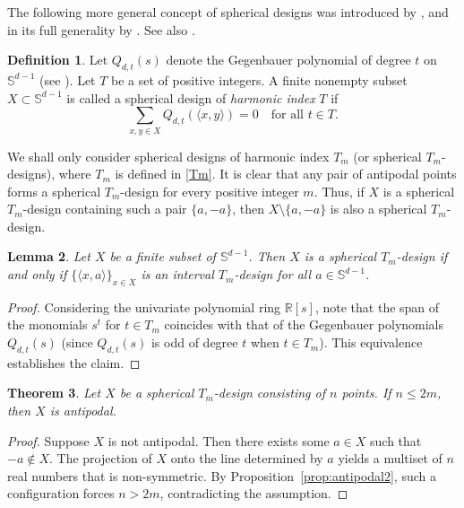 \documentclass[11pt]{amsart}
\newtheorem{thm}{Theorem}[section]
\newtheorem{lem}[thm]{Lemma}
\theoremstyle{definition}
\newtheorem{dfn}[thm]{Definition}
\newcommand{\R}{\mathbb{R}}
\begin{document}
The following more general concept of spherical designs was
introduced by \cite{MR3339051}, and in its full generality by 
\cite{MR3004471}.
See also \cite{MR4662467,MR4080490,MR3650263}.


\begin{dfn}
\label{def:sphT-design}
Let \( Q_{d,t}(s) \) denote the Gegenbauer polynomial of degree \( t \) on \(\mathbb{S}^{d-1}\) (see \cite[Lemma 2.1]{MR3339051}). Let \( T \) be a set of positive integers. A finite nonempty subset \( X\subset\mathbb{S}^{d-1} \) is called a spherical design of \emph{harmonic index} \( T \) if
\[
\sum_{x,y\in X} Q_{d,t}(\langle x,y\rangle)=0 \quad \text{for all } t\in T.
\]
\end{dfn}

We shall only consider spherical designs of harmonic index \( T_m \) (or spherical \( T_m \)-designs), where \( T_m \) is defined in \eqref{Tm}. It is clear that any pair of antipodal points forms a spherical \( T_m \)-design for every positive integer \( m \). Thus, if \( X \) is a spherical \( T_m \)-design containing such a pair \( \{a,-a\} \), then \( X\setminus\{a,-a\} \) is also a spherical \( T_m \)-design.

\begin{lem}
\label{lem:sphTm-design}
Let \( X \) be a finite subset of \(\mathbb{S}^{d-1}\). Then \( X \) is a spherical \( T_m \)-design if and only if $\{\langle x,a \rangle\}_{x\in X}$ is an interval $T_m$-design for all $a \in \mathbb{S}^{d-1}$.

\end{lem}
\begin{proof}
Considering the univariate polynomial ring \( \R[s] \), note that the span of the monomials \( s^t \) for \( t\in T_m \) coincides with that of the Gegenbauer polynomials \( Q_{d,t}(s) \) (since \( Q_{d,t}(s) \) is odd of degree \( t \) when \( t\in T_m \)). This equivalence establishes the claim.
\end{proof}

\begin{thm}
\label{thm:sph_main}
Let \( X \) be a spherical \( T_m \)-design consisting of \( n \) points. If \( n\le 2m \), then \( X \) is antipodal.
\end{thm}
\begin{proof}
Suppose \( X \) is not antipodal. Then there exists some \( a\in X \) such that \( -a\notin X \). 
The projection of \( X \) onto the line determined by \( a \) yields a multiset of \( n \) real numbers that is non-symmetric. By Proposition~\ref{prop:antipodal2}, such a configuration forces \( n>2m \), contradicting the assumption.
\end{proof}
\end{document}
